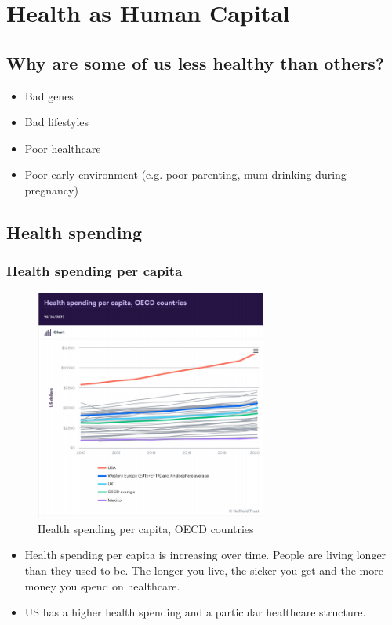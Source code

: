 \chapter{Health as Human Capital}


\section{Why are some of us less healthy than others?}
\begin{itemize}
        \item Bad genes
        \item Bad lifestyles
        \item Poor healthcare 
        \item Poor early environment 
        (e.g. poor parenting, mum drinking during pregnancy)
   \end{itemize}     
\section{Health spending}

        \subsection{Health spending per capita}

            \begin{figure}[H]%
                \centering
                \includegraphics[width=3in]{images/ch3/1 Health spending OECD.png}
                \caption{Health spending per capita, OECD countries}
                \label{fig:label}
            \end{figure}
\begin{itemize}
        \item Health spending per capita is increasing over time. People are living longer than they used to be. The longer you live, the sicker you get and the more money you spend on healthcare. 
        \item US has a higher health spending and a particular healthcare structure.
        \end{itemize}
        
